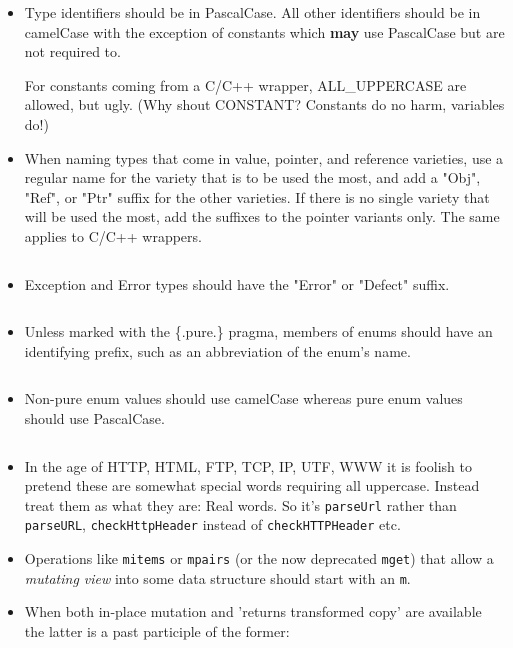 \begin{itemize}
\item
  Type identifiers should be in PascalCase. All other identifiers should
  be in camelCase with the exception of constants which \textbf{may} use
  PascalCase but are not required to.

\begin{Shaded}
\begin{Highlighting}[]

\end{Highlighting}
\end{Shaded}

  For constants coming from a C/C++ wrapper, ALL\_UPPERCASE are allowed,
  but ugly. (Why shout CONSTANT? Constants do no harm, variables do!)
\item
  When naming types that come in value, pointer, and reference
  varieties, use a regular name for the variety that is to be used the
  most, and add a "Obj", "Ref", or "Ptr" suffix for the other varieties.
  If there is no single variety that will be used the most, add the
  suffixes to the pointer variants only. The same applies to C/C++
  wrappers.

\begin{verbatim}
\end{verbatim}
\item
  Exception and Error types should have the "Error" or "Defect" suffix.

\begin{verbatim}
\end{verbatim}
\item
  Unless marked with the {\{.pure.\}} pragma, members of enums should
  have an identifying prefix, such as an abbreviation of the enum's
  name.

\begin{verbatim}
\end{verbatim}
\item
  Non-pure enum values should use camelCase whereas pure enum values
  should use PascalCase.

\begin{verbatim}
\end{verbatim}
\item
  In the age of HTTP, HTML, FTP, TCP, IP, UTF, WWW it is foolish to
  pretend these are somewhat special words requiring all uppercase.
  Instead treat them as what they are: Real words. So it's
  \texttt{parseUrl} rather than \texttt{parseURL},
  \texttt{checkHttpHeader} instead of \texttt{checkHTTPHeader} etc.
\item
  Operations like \texttt{mitems} or \texttt{mpairs} (or the now
  deprecated \texttt{mget}) that allow a \emph{mutating view} into some
  data structure should start with an \texttt{m}.
\item
  When both in-place mutation and 'returns transformed copy' are
  available the latter is a past participle of the former:


\end{itemize}
